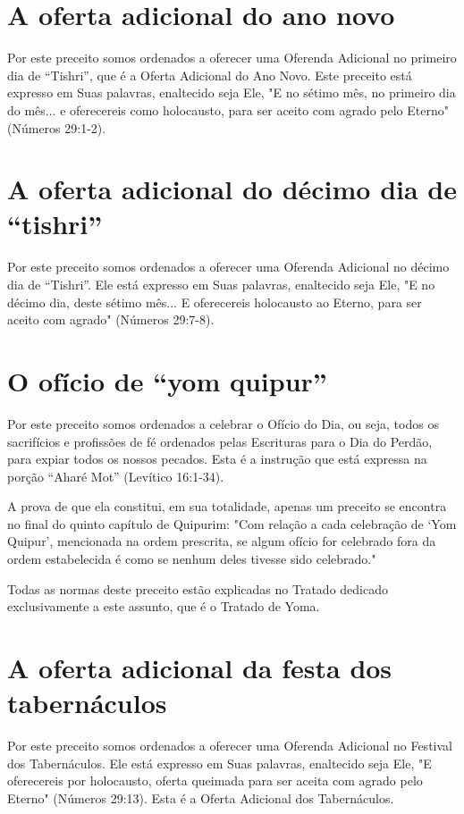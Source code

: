 \section{A oferta adicional do ano novo}

Por este preceito somos ordenados a oferecer uma Oferenda Adi­cional no
primeiro dia de ``Tishri'', que é a Oferta Adicional do Ano Novo. Este
preceito está expresso em Suas palavras, enaltecido seja Ele, "E no
sétimo mês, no primeiro dia do mês... e oferecereis como holocausto,
para ser aceito com agrado pelo Eterno" (Números 29:1-2).

\section{A oferta adicional do décimo dia de ``tishri''}

Por este preceito somos ordenados a oferecer uma Oferenda Adi­cional no
décimo dia de ``Tishri''. Ele está expresso em Suas palavras, enalteci­do
seja Ele, "E no décimo dia, deste sétimo mês... E oferecereis holocausto
ao Eterno, para ser aceito com agrado" (Números 29:7-8).

\section{O ofício de ``yom quipur''}

Por este preceito somos ordenados a celebrar o Ofício do Dia, ou seja,
todos os sacrifícios e profissões de fé ordenados pelas Escrituras para
o Dia do Perdão, para expiar todos os nossos pecados. Esta é a instrução
que está expressa na porção ``Aharé Mot'' (Levítico 16:1-34).



A prova de que ela constitui, em sua totalidade, apenas um preceito se
encontra no final do quinto capítulo de Quipurim: "Com relação a cada
ce­lebração de `Yom Quipur', mencionada na ordem prescrita, se algum
ofício for celebrado fora da ordem estabelecida é como se nenhum deles
tivesse sido ce­lebrado."

Todas as normas deste preceito estão explicadas no Tratado dedica­do
exclusivamente a este assunto, que é o Tratado de Yoma.

\section{A oferta adicional da festa dos tabernáculos}

Por este preceito somos ordenados a oferecer uma Oferenda Adi­cional no
Festival dos Tabernáculos. Ele está expresso em Suas palavras,
enal­tecido seja Ele, "E oferecereis por holocausto, oferta queimada
para ser aceita com agrado pelo Eterno" (Números 29:13). Esta é a Oferta
Adicional dos Ta­bernáculos.

